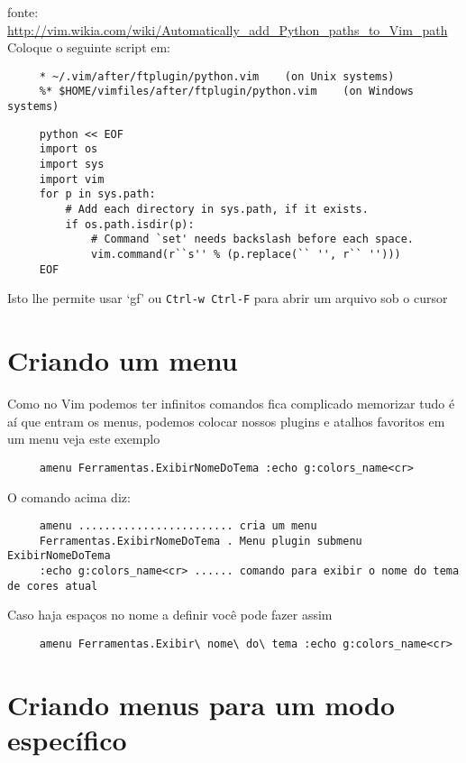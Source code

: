 fonte:
\url{http://vim.wikia.com/wiki/Automatically_add_Python_paths_to_Vim_path}
Coloque o seguinte script em:

\begin{verbatim}
     * ~/.vim/after/ftplugin/python.vim    (on Unix systems)
     %* $HOME/vimfiles/after/ftplugin/python.vim    (on Windows systems)
\end{verbatim}

\begin{verbatim}
     python << EOF
     import os
     import sys
     import vim
     for p in sys.path:
         # Add each directory in sys.path, if it exists.
         if os.path.isdir(p):
             # Command `set' needs backslash before each space.
             vim.command(r``s'' % (p.replace(`` '', r`` '')))
     EOF
\end{verbatim}

Isto lhe permite usar `gf' ou {\tt Ctrl-w Ctrl-F} para abrir um arquivo sob o cursor

\section{Criando um menu}
\label{Criando um menu}

Como no Vim podemos ter infinitos comandos fica complicado memorizar tudo
é aí que entram os menus, podemos colocar nossos plugins e atalhos favoritos
em um menu veja este exemplo

\begin{verbatim}
     amenu Ferramentas.ExibirNomeDoTema :echo g:colors_name<cr>
\end{verbatim}

O comando acima diz:

\begin{verbatim}
     amenu ........................ cria um menu
     Ferramentas.ExibirNomeDoTema . Menu plugin submenu ExibirNomeDoTema
     :echo g:colors_name<cr> ...... comando para exibir o nome do tema de cores atual
\end{verbatim}

Caso haja espaços no nome a definir você pode fazer assim

\begin{verbatim}
     amenu Ferramentas.Exibir\ nome\ do\ tema :echo g:colors_name<cr>
\end{verbatim}

\section{Criando menus para um modo específico}
\label{Criando menus para um modo específico}

